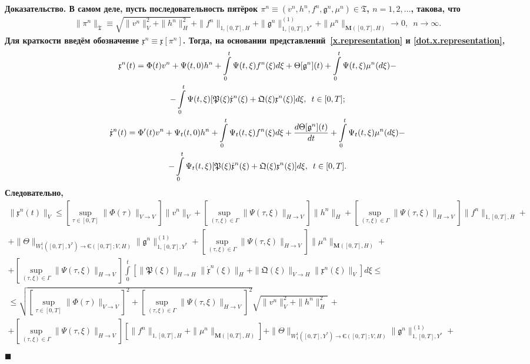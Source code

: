 \documentclass{report}
\newenvironment{Proof}{\par\noindent\bf Доказательство.\rm}{ $\blacksquare$\par}
\begin{document}
\begin{Proof}
В самом деле, пусть последовательность пятёрок $\pi^n\equiv(v^n,h^n,f^n,\mathfrak{g}^n,\mu^n)\in\mathfrak{T}$, $n=1,2,\dots$, такова, что
\begin{gather}\label{(v.h.f.g.mu).convergence}
\|\pi^n\|_{\mathfrak{T}}\equiv\sqrt{\|v^n\|_V^2+\|h^n\|_H^2}+\|f^n\|_{1,[0,T],H}+\|\mathfrak{g}^n\|^{(1)}_{1,[0,T],Y^*}+\|\mu^n\|_{\mathbf{M}([0,T],H)}\to0,\,\,\,n\to\infty.
\end{gather}
Для краткости введём обозначение $\mathfrak{x}^n\equiv\mathfrak{x}[\pi^n]$. Тогда, на основании представлений~\eqref{x.representation} и \eqref{dot.x.representation},
\begin{gather*}
\mathfrak{x}^n(t)=\Phi(t)v^n+\Psi(t,0)h^n+\int\limits_0^t\Psi(t,\xi)f^n(\xi)d\xi+\Theta[\mathfrak{g}^n](t)+\int\limits_{0}^{t}\Psi(t,\xi)\mu^n(d\xi)-\\
\notag-\int\limits_0^t\Psi(t,\xi)[\mathfrak{P}(\xi)\dot{\mathfrak{x}}^n(\xi) + \mathfrak{Q}(\xi){\mathfrak{x}}^n(\xi)]d\xi,\,\,\,t\in[0,T];\\
\dot{\mathfrak{x}}^n(t)=\Phi'(t)v^n+\Psi_t(t,0)h^n+\int\limits_0^t\Psi_t(t,\xi)f^n(\xi)d\xi+\frac{d\Theta[\mathfrak{g}^n](t)}{dt}+\int\limits_{0}^{t}\Psi_t(t,\xi)\mu^n(d\xi)-\\
\notag-\int\limits_0^t\Psi_t(t,\xi)[\mathfrak{P}(\xi)\dot{\mathfrak{x}}^n(\xi) + \mathfrak{Q}(\xi){\mathfrak{x}}^n(\xi)]d\xi,\,\,\,t\in[0,T].
\end{gather*}
Следовательно,
\begin{gather*}
\|\mathfrak{x}^n(t)\|_V\leqslant[\sup\limits_{\tau\in[0,T]}\|\Phi(\tau)\|_{V\to V}]\|v^n\|_V+[\sup\limits_{(\tau,\xi)\in\Gamma}\|\Psi(\tau,\xi)\|_{H\to V}]\|h^n\|_H+ [\sup\limits_{(\tau,\xi)\in\Gamma}\|\Psi(\tau,\xi)\|_{H\to V}]\|f^n\|_{1,[0,T],H}+\\
+\|\Theta\|_{W^1_1([0,T],Y^*)\to{\textrm{Є}}{}([0,T];V,H)}\|\mathfrak{g}^n\|^{(1)}_{1,[0,T],Y^*}+[\sup\limits_{(\tau,\xi)\in\Gamma}\|\Psi(\tau,\xi)\|_{H\to V}]\|\mu^n\|_{\mathbf{M}([0,T],H)}+\\
+[\sup\limits_{(\tau,\xi)\in\Gamma}\|\Psi(\tau,\xi)\|_{H\to V}]\int\limits_0^t[\|\mathfrak{P}(\xi)\|_{H\to H}\|\dot{\mathfrak{x}}^n(\xi)\|_H + \|\mathfrak{Q}(\xi)\|_{V\to H}\|{\mathfrak{x}}^n(\xi)\|_V]d\xi\leqslant\\
\leqslant\sqrt{[\sup\limits_{\tau\in[0,T]}\|\Phi(\tau)\|_{V\to V}]^2+[\sup\limits_{(\tau,\xi)\in\Gamma}\|\Psi(\tau,\xi)\|_{H\to V}]^2}\sqrt{\|v^n\|_V^2+\|h^n\|_H^2}\,+\\
+[\sup\limits_{(\tau,\xi)\in\Gamma}\|\Psi(\tau,\xi)\|_{H\to V}][\|f^n\|_{1,[0,T],H}+\|\mu^n\|_{\mathbf{M}([0,T],H)}]+\|\Theta\|_{W^1_1([0,T],Y^*)\to{\textrm{Є}}{}([0,T];V,H)}\|\mathfrak{g}^n\|^{(1)}_{1,[0,T],Y^*}+\\

\end{gather*}
\end{Proof}
\end{document}
